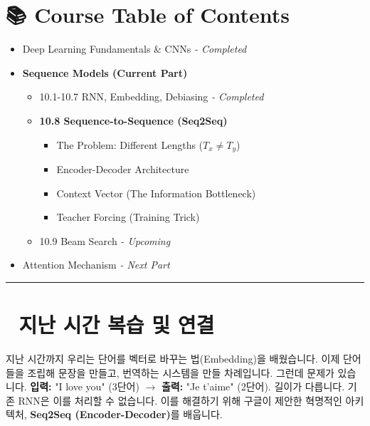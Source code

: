 \documentclass[11pt,a4paper]{book}
\theoremstyle{definition}
\begin{document}
\section*{📚 Course Table of Contents}
\begin{itemize}
    \item[Chapter 1-9.] Deep Learning Fundamentals \& CNNs \textit{- Completed}
    \item[\textbf{Chapter 10.}] \textbf{Sequence Models (Current Part)}
    \begin{itemize}
        \item 10.1-10.7 RNN, Embedding, Debiasing \textit{- Completed}
        \item \textbf{10.8 Sequence-to-Sequence (Seq2Seq)}
        \begin{itemize}
            \item The Problem: Different Lengths ($T_x \neq T_y$)
            \item Encoder-Decoder Architecture
            \item Context Vector (The Information Bottleneck)
            \item Teacher Forcing (Training Trick)
        \end{itemize}
        \item 10.9 Beam Search \textit{- Upcoming}
    \end{itemize}
    \item[Chapter 11.] Attention Mechanism \textit{- Next Part}
\end{itemize}

\vspace{0.5cm}
\hrule
\vspace{0.5cm}

\section*{🔗 지난 시간 복습 및 연결}
지난 시간까지 우리는 단어를 벡터로 바꾸는 법(Embedding)을 배웠습니다. 이제 단어들을 조립해 문장을 만들고, 번역하는 시스템을 만들 차례입니다.
그런데 문제가 있습니다.
\textbf{입력:} "I love you" (3단어) $\rightarrow$ \textbf{출력:} "Je t'aime" (2단어).
길이가 다릅니다. 기존 RNN은 이를 처리할 수 없습니다. 이를 해결하기 위해 구글이 제안한 혁명적인 아키텍처, \textbf{Seq2Seq (Encoder-Decoder)}를 배웁니다.

\end{document}

